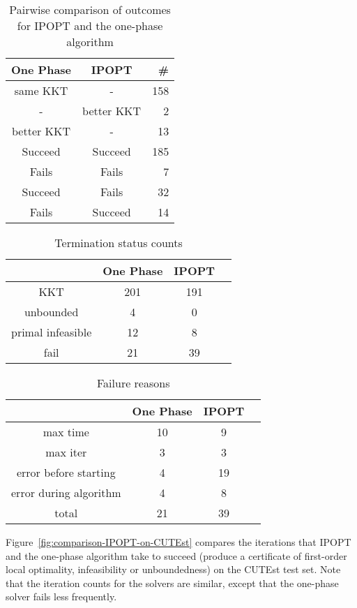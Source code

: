 \documentclass{article}
\begin{document}
\begin{table}[H]
\caption{Pairwise comparison of outcomes for IPOPT and the one-phase algorithm}\label{tbl:pairwise-outcomes}
\begin{tabular}{ c c r }
  One Phase &  IPOPT &  \# \\
  \hline
same KKT & - & 158  \\
- & better KKT & 2 \\
better KKT & - &  13 \\
\hline
Succeed & Succeed & 185 \\
Fails & Fails & 7 \\
Succeed & Fails &  32 \\
Fails & Succeed & 14 \\
\end{tabular}
\end{table}



\begin{table}[H]
\caption{Termination status counts}\label{tbl:termination-status-counts}
\begin{tabular}{ c c c r }
 &  One Phase &  IPOPT &  \\
  \hline
KKT &  201 & 191 \\
unbounded & 4 & 0  \\
primal infeasible & 12 &  8 \\
fail & 21 & 39 \\
\end{tabular}
\end{table}

\begin{table}[H]
\caption{Failure reasons}\label{tbl:failure-reasons}
\begin{tabular}{ c c c r }
 &  One Phase & IPOPT \\
  \hline
max time & 10 & 9  \\
max iter &  3 & 3 \\
error before starting & 4 & 19 \\
error during algorithm & 4 & 8 \\
\hline
total & 21 & 39
\end{tabular}
\end{table}

Figure~\ref{fig:comparison-IPOPT-on-CUTEst} compares the iterations that IPOPT and the one-phase algorithm take to succeed (produce a certificate of first-order local optimality, infeasibility or unboundedness) on the CUTEst test set. Note that the iteration counts for the solvers are similar, except that the one-phase solver fails less frequently.
\end{document}
